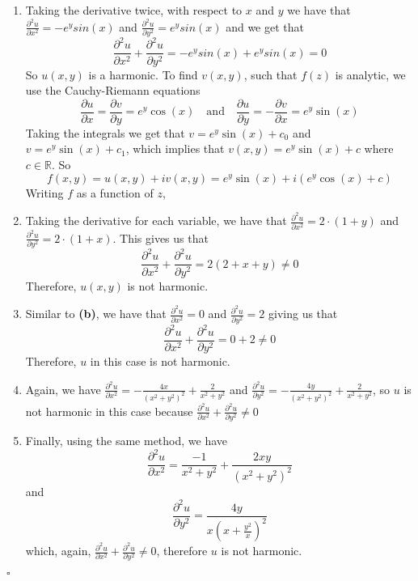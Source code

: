 \documentclass[12pt]{article}
\newcommand{\R}{\mathbb{R}}
\newenvironment{proof}{\noindent{\bf Proof.}}{\hfill $\square$\medskip}
\begin{document}
\begin{proof}
\begin{enumerate}[label=\textbf{(\alph*)}]
    \item Taking the derivative twice, with respect to $x$ and $y$ we have that $\frac{\partial^{2}u}{\partial x^{2}}=-e^{y}sin(x)$ and $\frac{\partial^{2}u}{\partial y^{2}}=e^{y}sin(x)$ and we get that
    $$\frac{\partial^{2}u}{\partial x^{2}}+\frac{\partial^{2}u}{\partial y^{2}}=-e^{y}sin(x)+e^{y}sin(x)=0$$
    So $u(x,y)$ is a harmonic. To find $v(x,y)$, such that $f(z)$ is analytic, we use the Cauchy-Riemann equations
    $$\frac{\partial u}{\partial x}=\frac{\partial v}{\partial y}=e^{y}\cos(x)\quad\text{and}\quad\frac{\partial u}{\partial y}=-\frac{\partial v}{\partial x}=e^{y}\sin(x)$$
    Taking the integrals we get that $v=e^{y}\sin(x)+c_{0}$ and $v=e^{y}\sin(x)+c_{1}$, which implies that $v(x,y)=e^{y}\sin(x)+c$ where $c\in\R$. So $$f(x,y)=u(x,y)+iv(x,y)=e^{y}\sin(x)+i(e^{y}\cos(x)+c)$$
    Writing $f$ as a function of $z$,
    \item Taking the derivative for each variable, we have that $\frac{\partial^{2}u}{\partial x^{2}}=2\cdot(1+y)$ and $\frac{\partial^{2}u}{\partial y^{2}}=2\cdot(1+x)$. This gives us that
    $$\frac{\partial^{2}u}{\partial x^{2}}+\frac{\partial^{2}u}{\partial y^{2}}=2(2+x+y)\neq0$$
    Therefore, $u(x,y)$ is not harmonic.
    \item Similar to \textbf{(b)}, we have that $\frac{\partial^{2}u}{\partial x^{2}}=0$ and $\frac{\partial^{2}u}{\partial y^{2}}=2$ giving us that
    $$\frac{\partial^{2}u}{\partial x^{2}}+\frac{\partial^{2}u}{\partial y^{2}}=0+2\neq0$$
    Therefore, $u$ in this case is not harmonic.
    \item Again, we have $\frac{\partial^{2}u}{\partial x^{2}}=-\frac{4x}{(x^{2}+y^{2})^{2}}+\frac{2}{x^{2}+y^{2}}$ and $\frac{\partial^{2}u}{\partial y^{2}}=-\frac{4y}{(x^{2}+y^{2})^{2}}+\frac{2}{x^{2}+y^{2}}$, so $u$ is not harmonic in this case because $\frac{\partial^{2}u}{\partial x^{2}}+\frac{\partial^{2}u}{\partial y^{2}}\neq0$
    \item Finally, using the same method, we have
    $$\frac{\partial^{2}u}{\partial x^{2}}=\frac{-1}{x^{2}+y^{2}}+\frac{2xy}{(x^{2}+y^{2})^{2}}$$
    and
    $$\frac{\partial^{2}u}{\partial y^{2}}=\frac{4y}{x(x+\frac{y^{2}}{x})^{2}}$$
    which, again, $\frac{\partial^{2}u}{\partial x^{2}}+\frac{\partial^{2}u}{\partial y^{2}}\neq0$, therefore $u$ is not harmonic.
\end{enumerate}
\end{proof}
\end{document}
